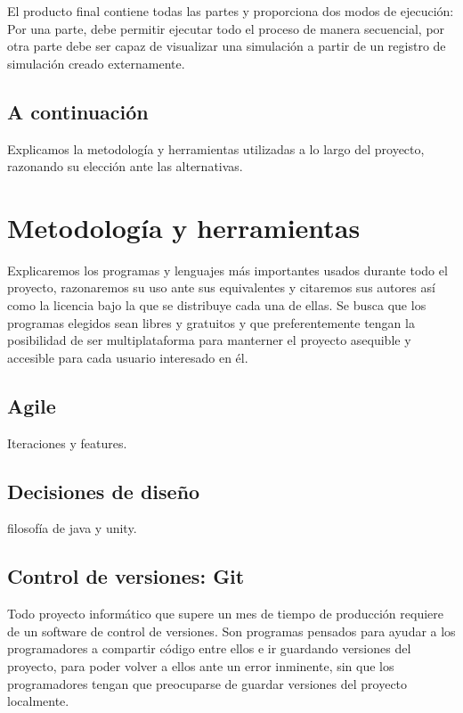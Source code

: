 \documentclass[12pt,a4paper,openright,oneside]{article}
\numberwithin{equation}{section}
\theoremstyle{definition}
\begin{document}
El producto final contiene todas las partes y proporciona dos modos de ejecución: Por una parte, debe permitir ejecutar todo el proceso de manera secuencial, por otra parte debe ser capaz de visualizar una simulación a partir de un registro de simulación creado externamente.


\subsection{A continuación}

Explicamos la metodología y herramientas utilizadas a lo largo del proyecto, razonando su elección ante las alternativas.



\newpage


\section{Metodología y herramientas}

Explicaremos los programas y lenguajes más importantes usados durante todo el proyecto, razonaremos su uso ante sus equivalentes y citaremos sus autores así como la licencia bajo la que se distribuye cada una de ellas. Se busca que los programas elegidos sean libres y gratuitos y que preferentemente tengan la posibilidad de ser multiplataforma para manterner el proyecto asequible y accesible para cada usuario interesado en él.

\subsection{ Agile }
Iteraciones y features.
\subsection{ Decisiones de diseño }
filosofía de java y unity.
\subsection{ Control de versiones: Git }

Todo proyecto informático que supere un mes de tiempo de producción requiere de un software de control de versiones. Son programas pensados para ayudar a los programadores a compartir código entre ellos e ir guardando versiones del proyecto, para poder volver a ellos ante un error inminente, sin que los programadores tengan que preocuparse de guardar versiones del proyecto localmente. 
\end{document}
